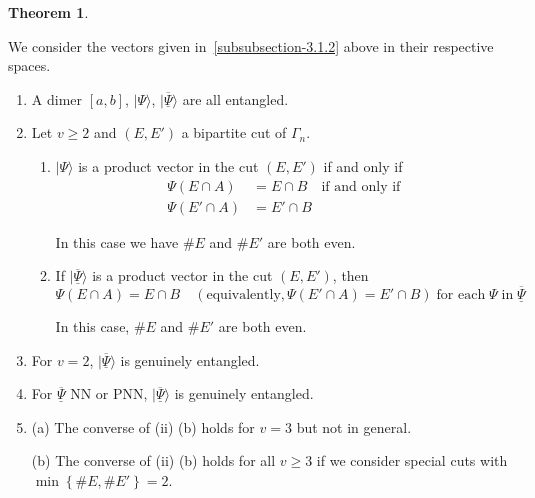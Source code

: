 \documentclass[a4paper,12pt]{article}
\theoremstyle{definition}
\theoremstyle{underlinethm}
\newtheorem{thm}{Theorem}[section]
\theoremstyle{definition}
\begin{document}
\begin{thm}\label{thm-3.1}

We consider the vectors given in~\eqref{subsubsection-3.1.2} above in their respective spaces.

\begin{enumerate}[label=(\roman*)]

\item A dimer $[a, b]$, $| \Psi \rangle$, $| \underline{\overline{\Psi}} \rangle$ are all entangled.

\item Let $v \geq 2$ and $(E, E')$ a  bipartite cut of $\Gamma_{n}$.

   \begin{enumerate}[label=(\alph*)]
    \item $| \Psi \rangle$ is a product vector in the cut $(E, E')$ if and only if 
			\begin{align*}
			\Psi(E \cap A) &= E \cap B \quad \text{if and only if}\\
			\Psi(E' \cap A) &= E'\cap B \tag{3.7}\label{eq-3.7}
			\end{align*}
			
	 In this case we have $\# E$ and $\# E'$ are both even.
	 \item If $| \underline{\overline{\Psi}} \rangle$ is a product vector in the cut $(E, E')$, then 
	 		\begin{equation}
	 		 \Psi(E \cap A) = E \cap B \quad ({\text {equivalently}}, \Psi (E' \cap A) = E' \cap B)\; \text{for each}\; \Psi \;\text{in}\; \underline{\overline{\Psi}}\tag{3.8}\label{eq-3.8}   
	 		\end{equation}
	 		
	 	In this case, $\# E$ and $\# E'$ are both even.	
    \end{enumerate}
    
   \item For $v=2$, $| \underline{\overline{\Psi}} \rangle$ is genuinely entangled.
   
   \item For $\underline{\overline{\Psi}} $ NN or PNN, $|\underline{\overline{\Psi}}\rangle$ is genuinely entangled.
   
   \item (a) The converse of (ii) (b) holds for $v=3$ but not in general.
   
   (b) The converse of (ii) (b) holds for all $v \geq 3$ if we consider special cuts with $\min \left\{ \# E, \# E' \right\} = 2$.
\end{enumerate}
\end{thm}
\end{document}
